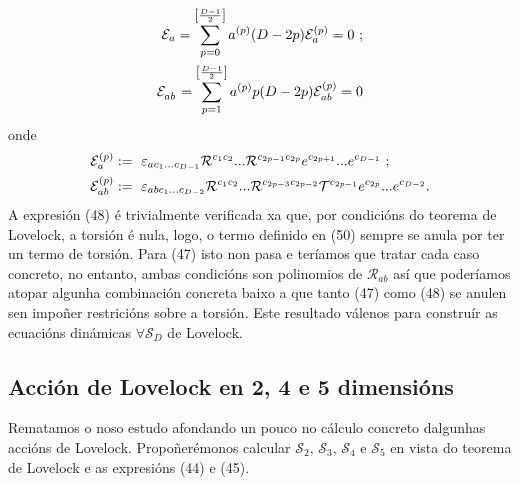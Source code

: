 \begin{align}
    \mathcal{E}_a = \sum_{p=0}^{\left[\frac{D-1}{2}\right]}a^{(p)}(D-2p)\mathcal{E}_a^{(p)} = 0\ ;\\
    \mathcal{E}\indices{_a_b} = \sum_{p=1}^{\left[\frac{D-1}{2}\right]}a^{(p)}p(D-2p)\mathcal{E}_{ab}^{(p)} = 0
\end{align}
onde
\begin{align}
    \mathcal{E}_{a}^{(p)} &:=\ \varepsilon_{ac_1...c_{D-1}}\mathcal{R}\indices{^{c_1}^{c_2}}...\mathcal{R}\indices{^{c_{2p-1}}^{c_{2p}}}e\indices{^{c_{2p+1}}}...e\indices{^{c_{D-1}}}\ ;\\
    \mathcal{E}_{ab}^{(p)} &:=\ \varepsilon_{abc_1...c_{D-2}}\mathcal{R}\indices{^{c_1}^{c_2}}...\mathcal{R}\indices{^{c_{2p-3}}^{c_{2p-2}}}\mathcal{T}^{c_{2p-1}}e\indices{^{c_{2p}}}...e\indices{^{c_{D-2}}}.
\end{align}
A expresión (48) é trivialmente verificada xa que, por condicións do teorema de Lovelock, a torsión é nula, logo, o termo definido en (50) sempre se anula por ter un termo de torsión. Para (47) isto non pasa e teríamos que tratar cada caso concreto, no entanto, ambas condicións son polinomios de $\mathcal{R}_{ab}$ así que poderíamos atopar algunha combinación concreta baixo a que tanto (47) como (48) se anulen sen impoñer restricións sobre a torsión. Este resultado válenos para construír as ecuacións dinámicas $\forall \mathcal{S}_D$ de Lovelock.


\subsection{Acción de Lovelock en 2, 4 e 5 dimensións}
Rematamos o noso estudo afondando un pouco no cálculo concreto dalgunhas accións de Lovelock. Propoñerémonos calcular $\mathcal{S}_2$, $\mathcal{S}_3$, $\mathcal{S}_4$ e $\mathcal{S}_5$ en vista do teorema de Lovelock e as expresións (44) e (45). %
